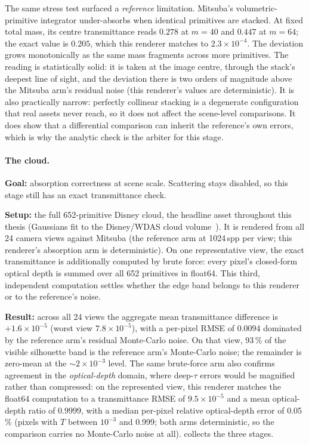 The same stress test surfaced a \emph{reference} limitation. Mitsuba's volumetric-primitive
integrator under-absorbs when identical primitives are stacked. At fixed total mass, its
centre transmittance reads $0.278$ at $m{=}40$ and $0.447$ at $m{=}64$; the exact value is
$0.205$, which this renderer matches to $2.3\times10^{-4}$. The deviation grows monotonically
as the same mass fragments across more primitives. The reading is statistically solid: it
is taken at the image centre, through the stack's deepest line of sight, and the deviation
there is two orders of magnitude above the Mitsuba arm's residual noise (this renderer's
values are deterministic). It is also practically narrow: perfectly collinear stacking is a
degenerate configuration that real assets never reach, so it does not affect the
scene-level comparisons. It does show that a differential comparison can inherit the
reference's own errors, which is why the analytic check is the arbiter for this stage.

\paragraph{The cloud.} \textbf{Goal:} absorption correctness at scene scale. Scattering stays
disabled, so this stage still has an exact transmittance check.

\textbf{Setup:} the full \num{652}-primitive Disney cloud, the headline asset throughout
this thesis (Gaussians fit to the Disney/WDAS cloud volume~\cite{WDASCloud2017}). It is rendered from all
\num{24} camera views against Mitsuba (the reference arm at \num{1024}\,spp per view; this
renderer's absorption arm is deterministic). On one representative view, the exact transmittance is additionally computed by brute
force: every pixel's closed-form optical depth is summed over all \num{652} primitives in
float64. This third, independent computation settles whether the edge band belongs to this renderer or to the reference's noise.

\textbf{Result:} across all \num{24} views
the aggregate mean transmittance difference is $+1.6\times10^{-5}$ (worst view
$7.8\times10^{-5}$), with a per-pixel RMSE of \num{0.0094} dominated by the reference arm's
residual Monte-Carlo noise. On that view, \num{93}\,\% of the visible silhouette band is the
reference arm's Monte-Carlo noise; the remainder is zero-mean at the ${\sim}2\times10^{-3}$
level. The same brute-force arm also confirms agreement in the \emph{optical-depth} domain,
where deep-$\tau$ errors would be magnified rather than compressed: on the represented view,
this renderer matches the float64 computation to a transmittance RMSE of $9.5\times10^{-5}$
and a mean optical-depth ratio of \num{0.9999}, with a median per-pixel relative
optical-depth error of \num{0.05}\,\% (pixels with $T$ between $10^{-3}$ and \num{0.999};
both arms deterministic, so the comparison carries no Monte-Carlo noise at all).
 collects the three stages.

